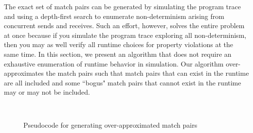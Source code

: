 The exact set of match pairs can be generated by simulating the program trace and using a depth-first search to enumerate non-determinism arising from concurrent sends and receives. Such an effort, however, solves the entire problem at once because if you simulate the program trace exploring all non-determinism, then you may as well verify all runtime choices for property violations at the same time. In this section, we present an algorithm that does not require an exhaustive enumeration of runtime behavior in simulation. Our algorithm over-approximates the match pairs such that match pairs that can exist in the runtime are all included and some ``bogus" match pairs that cannot exist in the runtime may or may not be included. %

\begin{figure}
\setlength{\tabcolsep}{20pt}
\begin{center}
\scalebox{0.7}{\usebox{\boxalgorithm}}\\
\end{center}
\caption{Pseudocode for generating over-approximated match pairs}
\label{fig:pseudocode}
\end{figure}

